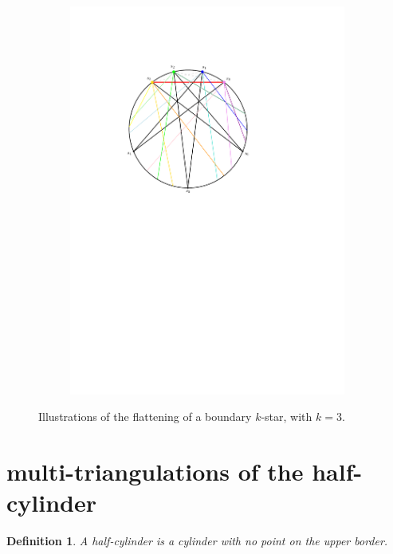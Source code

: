 \documentclass{amsart}
\newtheorem{definition}[theorem]{Definition}
\theoremstyle{remark}
\newcommand{\darkblue}{\color{darkblue}} %
\newcommand{\defn}[1]{\textsl{\darkblue #1}} %
\begin{document}
\begin{figure}
\begin{subfigure}[b]{.48\textwidth}
    \includegraphics[width=\textwidth,page=2]{exFlattening}
  \end{subfigure}
  \caption{Illustrations of the flattening of a boundary $k$-star, with $k=3$.}
  \label{fig:exProofStar}
\end{figure}


\section{multi-triangulations of the half-cylinder}

\begin{definition}
A \defn{half-cylinder} is a cylinder with no point on the upper border.
\end{definition}

\end{document}
